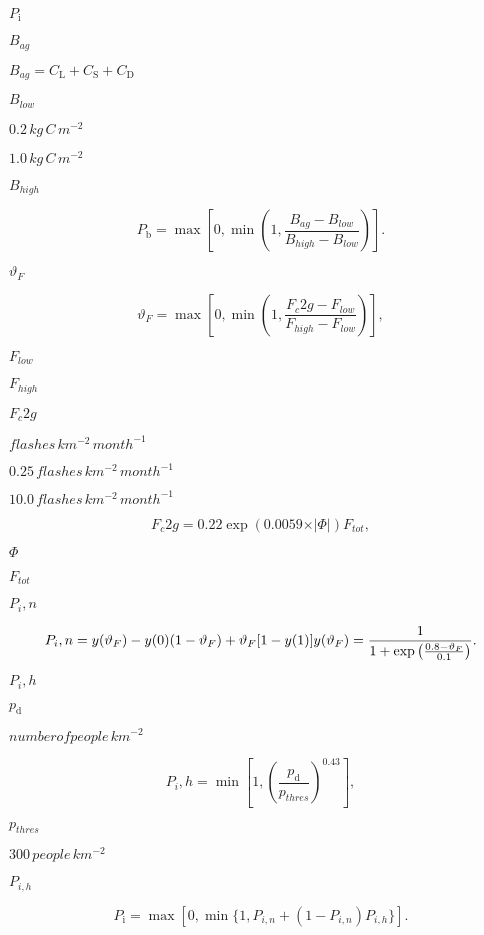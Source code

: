\documentclass{article}
\begin{document}
$P_\mathrm{i}$
\pagebreak

$B_{ag}$
\pagebreak

$B_{ag} = C_\mathrm{L} + C_\mathrm{S} + C_\mathrm{D}$
\pagebreak

$B_{low}$
\pagebreak

$0.2\, kg\,C\,m^{-2}$
\pagebreak

$1.0\, kg\,C\,m^{-2}$
\pagebreak

$B_{high}$
\pagebreak

\[ \label{eqn:Pb} P_\mathrm{b}=\max\left[0, \min\left(1,\frac{B_{ag}-B_{low}} {B_{high} - B_{low}}\right)\right]. \]
\pagebreak

$\vartheta_F$
\pagebreak

\[ \vartheta_F = \max\left[0, \min \left(1,\frac{F_c2g - F_{low}}{F_{high} - F_{low}} \right)\right],\]
\pagebreak

$F_{low}$
\pagebreak

$F_{high}$
\pagebreak

$F_c2g$
\pagebreak

$flashes\,km^{-2}\,month^{-1}$
\pagebreak

$0.25\,flashes\,km^{-2}\,month^{-1}$
\pagebreak

$10.0\,flashes\,km^{-2}\,month^{-1}$
\pagebreak

\[ F_c2g = 0.22 \exp (0.0059 \times \vert {\Phi}\vert) F_{tot},\]
\pagebreak

$\Phi$
\pagebreak

$F_{tot}$
\pagebreak

$P_i,n$
\pagebreak

\[ P_i,n = y(\vartheta_F) - y(0)(1 - \vartheta_F) + \vartheta_F[1-y(1)] \nonumber\\ y(\vartheta_F) = \frac{1}{1 + \exp\left(\frac{0.8 - \vartheta_F}{0.1}\right)}. \]
\pagebreak

$P_i,h$
\pagebreak

$p_\mathrm{d}$
\pagebreak

$number of people\,km^{-2}$
\pagebreak

\[ \label{eqn:Ph} P_i,h = \min\left[1,\left(\frac{p_\mathrm{d}}{p_{thres}}\right)^{0.43}\right], \]
\pagebreak

$p_{thres}$
\pagebreak

$300\,people\,km^{-2}$
\pagebreak

$P_{i,h}$
\pagebreak

\[ \label{eqn:Pi} P_\mathrm{i} = \max[0, \min\{1, P_{i,n} + (1 - P_{i,n})P_{i,h}\}]. \]
\pagebreak
\end{document}
